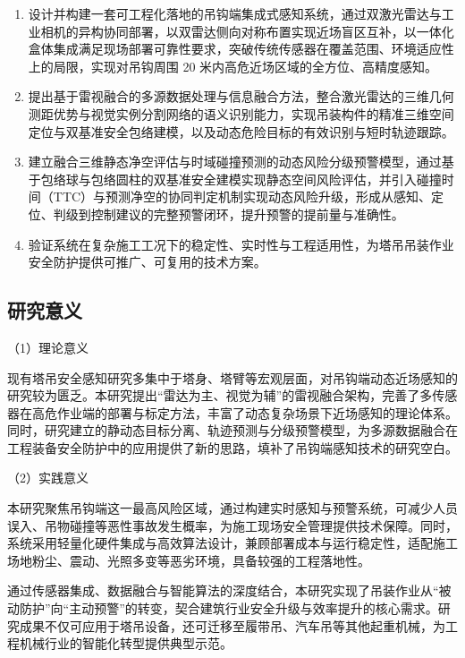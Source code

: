\begin{enumerate}
\def\labelenumi{(\arabic{enumi})}
\item
  设计并构建一套可工程化落地的吊钩端集成式感知系统，通过双激光雷达与工业相机的异构协同部署，以双雷达侧向对称布置实现近场盲区互补，以一体化盒体集成满足现场部署可靠性要求，突破传统传感器在覆盖范围、环境适应性上的局限，实现对吊钩周围 20 米内高危近场区域的全方位、高精度感知。
\item
  提出基于雷视融合的多源数据处理与信息融合方法，整合激光雷达的三维几何测距优势与视觉实例分割网络的语义识别能力，实现吊装构件的精准三维空间定位与双基准安全包络建模，以及动态危险目标的有效识别与短时轨迹跟踪。
\item
  建立融合三维静态净空评估与时域碰撞预测的动态风险分级预警模型，通过基于包络球与包络圆柱的双基准安全建模实现静态空间风险评估，并引入碰撞时间（TTC）与预测净空的协同判定机制实现动态风险升级，形成从感知、定位、判级到控制建议的完整预警闭环，提升预警的提前量与准确性。
\item
  验证系统在复杂施工工况下的稳定性、实时性与工程适用性，为塔吊吊装作业安全防护提供可推广、可复用的技术方案。
\end{enumerate}

\subsection{研究意义}\label{ux7814ux7a76ux610fux4e49}

（1）理论意义

现有塔吊安全感知研究多集中于塔身、塔臂等宏观层面，对吊钩端动态近场感知的研究较为匮乏。本研究提出“雷达为主、视觉为辅”的雷视融合架构，完善了多传感器在高危作业端的部署与标定方法，丰富了动态复杂场景下近场感知的理论体系。同时，研究建立的静动态目标分离、轨迹预测与分级预警模型，为多源数据融合在工程装备安全防护中的应用提供了新的思路，填补了吊钩端感知技术的研究空白。

（2）实践意义

本研究聚焦吊钩端这一最高风险区域，通过构建实时感知与预警系统，可减少人员误入、吊物碰撞等恶性事故发生概率，为施工现场安全管理提供技术保障。同时，系统采用轻量化硬件集成与高效算法设计，兼顾部署成本与运行稳定性，适配施工场地粉尘、震动、光照多变等恶劣环境，具备较强的工程落地性。

通过传感器集成、数据融合与智能算法的深度结合，本研究实现了吊装作业从“被动防护”向“主动预警”的转变，契合建筑行业安全升级与效率提升的核心需求。研究成果不仅可应用于塔吊设备，还可迁移至履带吊、汽车吊等其他起重机械，为工程机械行业的智能化转型提供典型示范。


